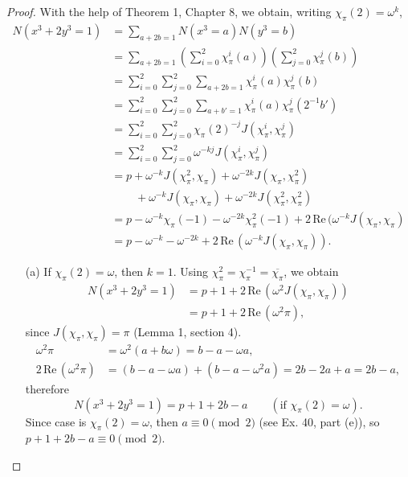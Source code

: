 \documentclass[11pt,a4paper]{article}
\newcommand{\re}{\,\mathrm{Re}\,}
\begin{document}
\begin{proof}
With the help of Theorem 1, Chapter 8, we obtain, writing $\chi_\pi(2) = \omega^k$,
\begin{align*}
N(x^3 + 2 y^3 = 1)&= \sum_{a+2b = 1} N(x^3 =a) N(y^3 = b)\\
&=\sum_{a+2b = 1} \left(\sum_{i=0}^2 \chi_\pi^i(a)\right)\left( \sum_{j=0}^2 \chi_\pi^j(b)\right)\\
&=\sum_{i=0}^2\sum_{j=0}^2 \sum_{a+2b=1} \chi_\pi^i(a)\chi_\pi^j(b)\\
&=\sum_{i=0}^2\sum_{j=0}^2  \sum_{a+b' = 1} \chi_\pi^i(a) \chi_\pi^j(2^{-1} b')\\
&=\sum_{i=0}^2\sum_{j=0}^2 \chi_\pi(2)^{-j} J(\chi_\pi^i, \chi_\pi^j)\\
&=\sum_{i=0}^2\sum_{j=0}^2 \omega^{-kj} J(\chi_\pi^i, \chi_\pi^j)\\
&= p + \omega^{-k} J(\chi_\pi^2,\chi_\pi) + \omega^{-2k} J(\chi_\pi,\chi_\pi^2)\\
&\phantom{= p .} + \omega^{-k} J(\chi_\pi, \chi_\pi) + \omega^{-2k} J(\chi_\pi^2, \chi_\pi^2)\\
&=p - \omega^{-k} \chi_\pi(-1) - \omega^{-2k} \chi_\pi^2(-1) + 2 \re(\omega^{-k} J(\chi_\pi,\chi_\pi)\\
&= p - \omega^{-k} -  \omega^{-2k} +  2 \re(\omega^{-k} J(\chi_\pi,\chi_\pi)).
\end{align*}

\begin{enumerate}

\item[(a)] If $\chi_\pi(2) = \omega$, then $k=1$. Using $\chi_\pi^2 = \chi_\pi^{-1} =\overline{\chi_\pi}$, we obtain
\begin{align*}
N(x^3 + 2 y^3 = 1)&= p+1+ 2 \re(\omega^{2} J(\chi_\pi,\chi_\pi))\\
&=p+1 + 2 \re(\omega^2 \pi),
\end{align*}
since $J(\chi_\pi,\chi_\pi) = \pi$ (Lemma 1, section 4).
\begin{align*}
\omega^2\pi &= \omega^2(a + b \omega) = b - a -\omega a,\\
2 \re(\omega^2\pi) &= (b-a -\omega a) + (b - a - \omega^2 a) = 2b-2a + a = 2b-a,
\end{align*}
therefore
$$N(x^3 + 2 y^3 = 1) = p+1 + 2b -a\qquad (\text{if }\chi_\pi(2) = \omega).$$
Since case is $\chi_\pi(2) = \omega$, then $a \equiv 0 \pmod 2$ (see Ex. 40, part (e)), so $p + 1 + 2b -a \equiv 0 \pmod 2$.


\end{enumerate}
\end{proof}
\end{document}
